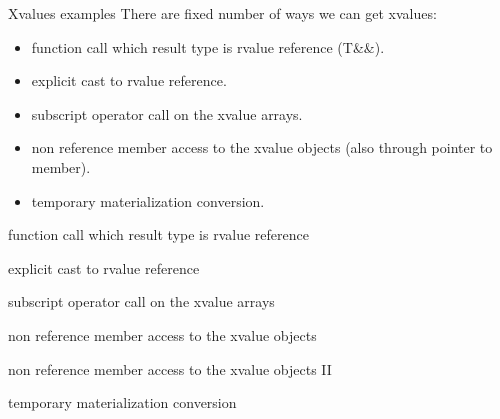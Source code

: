 \documentclass[10pt]{beamer}
\begin{document}
\begin{frame}{Xvalues examples}
	There are fixed number of ways we can get xvalues:
	\begin{itemize}
		\item function call which result type is rvalue reference (T\&\&).
		\item explicit cast to rvalue reference.
		\item subscript operator call on the xvalue arrays.
		\item non reference member access to the xvalue objects (also through pointer to member).
		\item temporary materialization conversion.
	\end{itemize}
\end{frame}

\begin{frame}{function call which result type is rvalue reference}
	
\end{frame}

\begin{frame}{explicit cast to rvalue reference}

\end{frame}

\begin{frame}{subscript operator call on the xvalue arrays}
	
\end{frame}

\begin{frame}{non reference member access  to the xvalue objects}
	
\end{frame}

\begin{frame}{non reference member access  to the xvalue objects II}

\end{frame}

\begin{frame}{temporary materialization conversion}

\end{frame}
\end{document}
